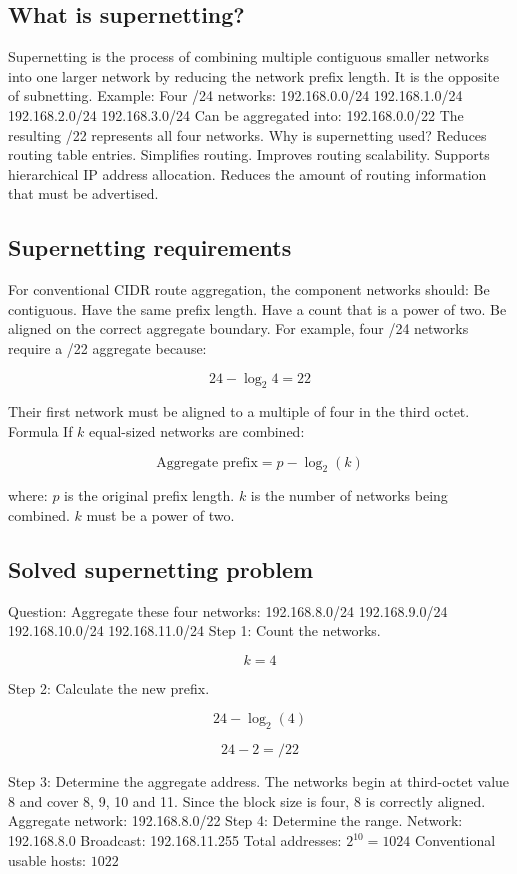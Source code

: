 \subsection{What is supernetting?}
Supernetting is the process of combining multiple contiguous smaller networks into one larger network by reducing the network prefix length.
It is the opposite of subnetting.
Example:
Four /24 networks:
192.168.0.0/24
192.168.1.0/24
192.168.2.0/24
192.168.3.0/24
Can be aggregated into:
192.168.0.0/22
The resulting /22 represents all four networks.
Why is supernetting used?
Reduces routing table entries.
Simplifies routing.
Improves routing scalability.
Supports hierarchical IP address allocation.
Reduces the amount of routing information that must be advertised.
\subsection{Supernetting requirements}
For conventional CIDR route aggregation, the component networks should:
Be contiguous.
Have the same prefix length.
Have a count that is a power of two.
Be aligned on the correct aggregate boundary.
For example, four /24 networks require a /22 aggregate because:

\[
24-\log_2 4=22
\]

Their first network must be aligned to a multiple of four in the third octet.
Formula
If $k$ equal-sized networks are combined:

\[
\boxed{\text{Aggregate prefix}=p-\log_2(k)}
\]

where:
$p$ is the original prefix length.
$k$ is the number of networks being combined.
$k$ must be a power of two.
\subsection{Solved supernetting problem}
Question: Aggregate these four networks:
192.168.8.0/24
192.168.9.0/24
192.168.10.0/24
192.168.11.0/24
Step 1: Count the networks.

\[
k=4
\]

Step 2: Calculate the new prefix.

\[
24-\log_2(4)
\]


\[
24-2=\boxed{/22}
\]

Step 3: Determine the aggregate address.
The networks begin at third-octet value 8 and cover 8, 9, 10 and 11.
Since the block size is four, 8 is correctly aligned.
Aggregate network:
192.168.8.0/22
Step 4: Determine the range.
Network: 192.168.8.0
Broadcast: 192.168.11.255
Total addresses: $2^{10}=1024$
Conventional usable hosts: $1022$
